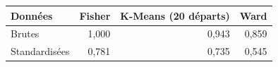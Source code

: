 \begin{tabular}{lrrr}
\toprule
Données & Fisher & K-Means (20 départs) & Ward \\
\midrule
Brutes & 1{,}000 & 0{,}943 & 0{,}859 \\
Standardisées & 0{,}781 & 0{,}735 & 0{,}545 \\
\bottomrule
\end{tabular}
